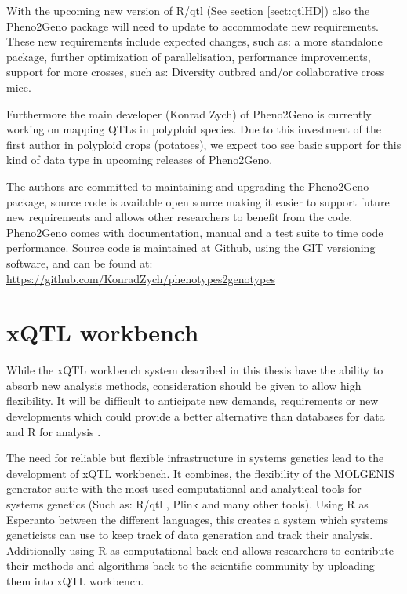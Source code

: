 With the upcoming new version of R/qtl (See section \ref{sect:qtlHD}) also the Pheno2Geno 
package will need to update to accommodate new requirements. These new requirements include 
expected changes, such as: a more standalone package, further optimization of parallelisation, 
performance improvements, support for more crosses, such as: Diversity outbred and/or 
collaborative cross mice.

Furthermore the main developer (Konrad Zych) of Pheno2Geno is currently working on mapping QTLs 
in polyploid species. Due to this investment of the first author in polyploid crops (potatoes), 
we expect too see basic support for this kind of data type in upcoming releases of Pheno2Geno.

The authors are committed to maintaining and upgrading the Pheno2Geno package, source code 
is available open source making it easier to support future new requirements and allows other 
researchers to benefit from the code. Pheno2Geno comes with documentation, manual and a test 
suite to time code performance. Source code is maintained at Github, using the GIT versioning 
software, and can be found at:\\
\url{https://github.com/KonradZych/phenotypes2genotypes}

\section{xQTL workbench}
\label{sect:xQTLworkbench}
While the xQTL workbench system described in this thesis have the ability to absorb new 
analysis methods, consideration should be given to allow high flexibility. It will be 
difficult to anticipate new demands, requirements or new developments which could provide 
a better alternative than databases for data and R for analysis \cite{Arends:2012}.

The need for reliable but flexible infrastructure in systems genetics lead to the development of 
xQTL workbench. It combines, the flexibility of the MOLGENIS generator suite \cite{Swertz:2010b} 
with the most used computational and analytical tools for systems genetics (Such as: R/qtl 
\cite{Broman:2003, Arends:2010}, Plink \cite{Purcell:2007} and many other tools). Using R as 
Esperanto between the different languages, this creates a system which systems geneticists can 
use to keep track of data generation and track their analysis. Additionally using R as computational 
back end allows researchers to contribute their methods and algorithms back to the scientific 
community by uploading them into xQTL workbench.

